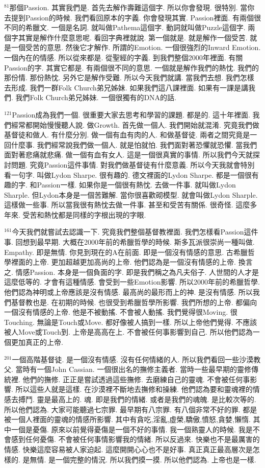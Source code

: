 \documentclass{book}
\begin{document}
$^{81}$那個Passion.
其實我們是.
首先去解作壽難這個字.
所以你會發現.
很特別.
當你去提到Passion的時候.
我們看回原本的字義.
你會發現其實.
Passion裡面.
有兩個很不同的希臘文.
一個是名詞.
就叫做Pathema這個字.
動詞就叫做Puzzle這個字.
兩個字其實是解作什麼意思呢.
看回字典裡就說.
第一個就是.
就是解作一個受苦.
就是一個受苦的意思.
然後它才解作.
所謂的Emotion.
一個很強烈的Inward Emotion.
一個內在的情感.
所以從來都是.
從聖經的字義.
到我們整個2000年裡面.
有關Passion的字.
其實它都是.
有兩個很不同的意思.
一個就是解作我們的熱忱.
我們的那份情.
那份熱忱.
另外它是解作受難.
所以今天我們就講.
當我們去想.
我們怎樣去形成.
我們一群Folk Church弟兄姊妹.
如果我們這八課裡面.
如果有一課是講我們.
我們Folk Church弟兄姊妹.
一個很獨有的DNA的話.

$^{121}$Passion成為我們一個.
很重要大家去思考和學習的課題.
都是的.
這十年裡面.
我們經常都開始慢慢聽人說.
做Growth.
首先做一個人.
我們開始就混淆.
究竟我們做基督徒和做人.
有什麼分別.
做一個有血有肉的人.
和做基督徒.
兩者之間究竟是一回什麼事.
我們經常說我們做一個人.
就是怕就怕.
我們面對著恐懼就恐懼.
當我們面對著悲痛就悲痛.
做一個有血有女人.
這是一個很真實的事情.
所以我們今天就探討問題.
究竟Passion這件事情.
對我們做基督徒有什麼意義.
所以今天我就會特別看一句字.
叫做Lydon Sharpe.
很有趣的.
德文裡面的Lydon Sharpe.
都是一個很有趣的字.
和Passion一樣.
如果你是一個很有熱忱.
去做一件事.
就叫做Lydon Sharple.
但Lydon本身是一個苦難解.
當你很喜歡砌模型.
就會叫做Lydon Sharple.
這樣做一些事.
所以當我很有熱忱去做一件事.
甚至和受苦有關係.
很奇怪.
這麼多年來.
受苦和熱忱都是同樣的字根出現的字眼.

$^{161}$今天我們就嘗試去認識一下.
究竟我們整個基督教裡面.
我們怎樣看Passion這件事.
回想到最早期.
大概在2000年前的希臘哲學的時候.
斯多瓦派很崇尚一種叫做.
Empathy.
即是無情.
你見到現在的A在前面.
即是一個沒有情感的意思.
古希臘哲學裡面的上帝.
更加超越更加高尚的上帝.
他們認為是一個沒有情感的上帝.
換言之.
情感Passion.
本身是一個負面的字.
即是我們稱之為凡夫俗子.
人世間的人才是這麼低等的.
才會有這種情感.
會受到一些Emotion影響.
所以2000年前的希臘哲學.
他們認為神明或上帝應該是沒有情感.
最高尚的最形而上的神.
是沒有情感.
所以我們基督教也是.
在初期的時候.
也很受到希臘哲學所影響.
我們所想的上帝.
都偏向一個沒有情感的上帝.
他是不被動搖.
不會被人動搖.
我們覺得很Moving.
很Touching.
無論是Touch或Move.
都好像被人搞到一樣.
所以上帝他們覺得.
不應該被人Move或Touch到.
上帝是高高在上.
不會被任何事影響到自己.
所以他們認為一個更加真正的上帝.

$^{201}$一個高階基督徒.
是一個沒有情感.
沒有任何情緒的人.
所以我們看回一些沙漠教父.
當時有一個John Cassian.
一個很出名的撫修主義者.
當時一些最早期的靈修傳統裡.
他們的撫修.
正正是嘗試透過這些撫修.
去磨練自己的靈魂.
不會被任何事影響.
所以這些人就是這樣.
在沙漠裡不斷地去撫修和操練.
他們認為要和靈魂裡的情感去搏鬥.
靈是最高上的.
魂.
即是我們的情緒.
或者是我們的魂魄.
是比較次等的.
所以他們認為.
大家可能聽過七宗罪.
最早期有八宗罪.
有八個非常不好的罪.
都是被一個人裡面的靈魂的情感所影響.
其中有貪吃,淫亂,虛榮,驕傲,憤怒,貪婪,懶惰.
其中一個是憂傷.
原來以前覺得憂傷是一個不好的事情.
我一個熟靈人的時候.
我是不會感到任何憂傷.
不會被任何事情影響我的情緒.
所以反過來.
快樂也不是最厲害的情感.
快樂這麼容易被人家迫起.
這麼開開心心也不是好事.
真正真正最高層次是怎樣的.
是無情.
是一個完整的情況.
所以我們摸一摸.
所以他們認為.
上帝也是一樣.
\end{document}
